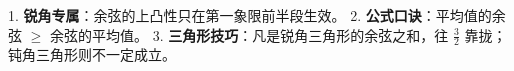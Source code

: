 \begin{summarybox}
1. \textbf{锐角专属}：余弦的上凸性只在第一象限前半段生效。
2. \textbf{公式口诀}：平均值的余弦 $\geqslant$ 余弦的平均值。
3. \textbf{三角形技巧}：凡是锐角三角形的余弦之和，往 $\frac{3}{2}$ 靠拢；钝角三角形则不一定成立。
\end{summarybox}